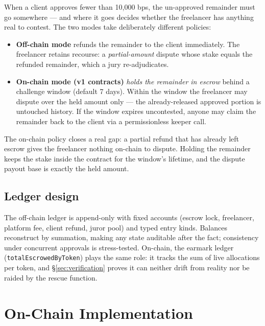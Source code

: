 \documentclass[11pt,letterpaper]{article}
\begin{document}
When a client approves fewer than 10{,}000 bps, the un-approved remainder must go
somewhere --- and where it goes decides whether the freelancer has anything real to
contest. The two modes take deliberately different policies:

\begin{itemize}
\item \textbf{Off-chain mode} refunds the remainder to the client immediately. The
freelancer retains recourse: a \emph{partial-amount} dispute whose stake equals the
refunded remainder, which a jury re-adjudicates.
\item \textbf{On-chain mode (v1 contracts)} \emph{holds the remainder in escrow}
behind a challenge window (default 7 days). Within the window the freelancer may
dispute over the held amount only --- the already-released approved portion is
untouched history. If the window expires uncontested, anyone may claim the remainder
back to the client via a permissionless keeper call.
\end{itemize}

The on-chain policy closes a real gap: a partial refund that has already left escrow
gives the freelancer nothing on-chain to dispute. Holding the remainder keeps the
stake inside the contract for the window's lifetime, and the dispute payout base is
exactly the held amount.

\subsection{Ledger design}

The off-chain ledger is append-only with fixed accounts (escrow lock, freelancer,
platform fee, client refund, juror pool) and typed entry kinds. Balances reconstruct
by summation, making any state auditable after the fact; consistency under concurrent
approvals is stress-tested. On-chain, the earmark ledger
(\texttt{totalEscrowedByToken}) plays the same role: it tracks the sum of live
allocations per token, and \S\ref{sec:verification} proves it can neither drift from
reality nor be raided by the rescue function.

\section{On-Chain Implementation}\label{sec:contracts}
\end{document}
